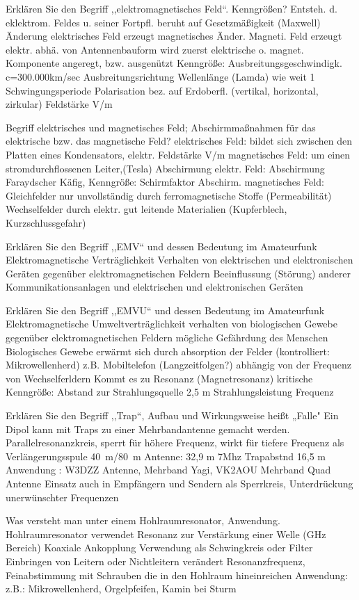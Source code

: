 \documentclass[avery5371,grid,frame,a4paper]{flashcards}
\newcommand{\card}[3]{
  \begin{flashcard}[{\chap} -- #1]{#2}#3\end{flashcard}
}
\begin{document}
\card{85}{Erklären Sie den Begriff ,,elektromagnetisches Feld``. Kenngrößen?}{
  Entsteh. d. eklektrom. Feldes u. seiner Fortpfl.
beruht auf Gesetzmäßigkeit (Maxwell)
Änderung elektrisches Feld erzeugt magnetisches 
Änder. Magneti. Feld erzeugt elektr.
abhä. von Antennenbauform wird zuerst elektrische
o. magnet. Komponente angeregt, bzw. ausgenützt
Kenngröße: Ausbreitungsgeschwindigk. c=300.000km/sec
Ausbreitungsrichtung
Wellenlänge (Lamda) wie weit 1 Schwingungsperiode
Polarisation bez. auf Erdoberfl. (vertikal, horizontal, 
zirkular)
Feldstärke V/m
}
\card{86}{Begriff elektrisches und magnetisches Feld; Abschirmmaßnahmen für das elektrische bzw. das magnetische Feld?}{
  elektrisches Feld: bildet sich zwischen den Platten
eines Kondensators, elektr. Feldstärke V/m
magnetisches Feld: um einen stromdurchflossenen Leiter,(Tesla)
Abschirmung elektr. Feld: Abschirmung Faraydscher Käfig,
Kenngröße: Schirmfaktor 
Abschirm. magnetisches Feld: Gleichfelder nur unvollständig
durch ferromagnetische Stoffe (Permeabilität) 
Wechselfelder durch elektr. gut leitende Materialien
(Kupferblech, Kurzschlussgefahr)
}
\card{87}{Erklären Sie den Begriff ,,EMV`` und dessen Bedeutung im Amateurfunk}{
  Elektromagnetische Verträglichkeit
Verhalten von elektrischen und 
elektronischen Geräten gegenüber
elektromagnetischen Feldern
Beeinflussung (Störung) anderer 
Kommunikationsanlagen und elektrischen
und elektronischen Geräten
}
\card{88}{Erklären Sie den Begriff ,,EMVU`` und dessen Bedeutung im Amateurfunk}{
  Elektromagnetische Umweltverträglichkeit
verhalten von biologischen Gewebe gegenüber
elektromagnetischen Feldern
mögliche Gefährdung des Menschen
Biologisches Gewebe erwärmt sich durch
absorption der Felder (kontrolliert: Mikrowellenherd) z.B.
Mobiltelefon (Langzeitfolgen?)
abhängig von der Frequenz von Wechselferldern
Kommt es zu Resonanz (Magnetresonanz)
kritische Kenngröße: Abstand zur Strahlungsquelle 2,5 m
Strahlungsleistung
Frequenz
}
\card{89}{Erklären Sie den Begriff ,,Trap``, Aufbau und Wirkungsweise}{
  heißt „Falle"
Ein Dipol kann mit Traps zu einer Mehrbandantenne
gemacht werden.
Parallelresonanzkreis, sperrt für höhere Frequenz,
wirkt für tiefere Frequenz als Verlängerungsspule
\SI{40}{\metre}/\SI{80}{\metre} Antenne: 32,9 m 7Mhz Trapabstnd 16,5 m
Anwendung : W3DZZ Antenne, Mehrband Yagi, 
VK2AOU Mehrband Quad Antenne
Einsatz auch in Empfängern und Sendern als
Sperrkreis, Unterdrückung unerwünschter Frequenzen
}
\card{90}{Was versteht man unter einem Hohlraumresonator, Anwendung.}{
  Hohlraumresonator verwendet Resonanz zur
Verstärkung einer Welle (GHz Bereich)
Koaxiale Ankopplung
Verwendung als Schwingkreis oder Filter
Einbringen von Leitern oder Nichtleitern
verändert Resonanzfrequenz, Feinabstimmung
mit Schrauben die in den Hohlraum
hineinreichen
Anwendung: z.B.: Mikrowellenherd, Orgelpfeifen,
Kamin bei Sturm
}
\end{document}
